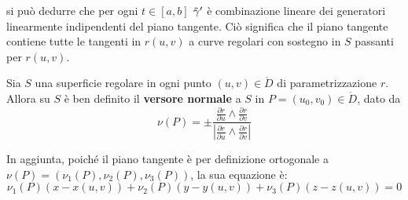 si può dedurre che per ogni $t \in [a,b]$ $\Tilde{\gamma}'$ è combinazione lineare dei generatori linearmente indipendenti del piano tangente. Ciò significa che il piano tangente contiene tutte le tangenti in $r(u,v)$ a curve regolari con sostegno in $S$ passanti per $r(u,v)$.
\begin{definition} \label{Def: Versore normale a una superficie}
    Sia $S$ una superficie regolare in ogni punto $(u,v)\in \mathring{D}$ di parametrizzazione $r$. Allora su $S$ è ben definito il \textbf{versore normale} a $S$ in $P=(u_0,v_0) \in \mathring{D}$, dato da
    \begin{equation}
        \nu(P)= \pm \frac{\frac{\partial r}{\partial u} \wedge \frac{\partial r}{\partial v}}{\left|\frac{\partial r}{\partial u} \wedge \frac{\partial r}{\partial v}\right|}
    \end{equation}
\end{definition}
    In aggiunta, poiché il piano tangente è per definizione ortogonale a $\nu(P)=(\nu_1(P), \nu_2(P), \nu_3(P))$, la sua equazione è:
    \begin{equation} \label{Eq: Equazione piano tangente a una superficie}
        \nu_1(P)(x-x(u,v))+ \nu_2(P)(y-y(u,v))+\nu_3(P)(z-z(u,v))=0
    \end{equation}
